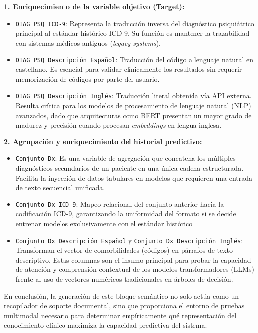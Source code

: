 \documentclass[12pt,a4paper,onecolumn,oneside]{report}
\begin{document}
\textbf{1. Enriquecimiento de la variable objetivo (Target):}
\begin{itemize}
    \item \texttt{DIAG PSQ ICD-9}: Representa la traducción inversa del diagnóstico psiquiátrico principal al estándar histórico ICD-9. Su función es mantener la trazabilidad con sistemas médicos antiguos (\textit{legacy systems}).
    \item \texttt{DIAG PSQ Descripción Español}: Traducción del código a lenguaje natural en castellano. Es esencial para validar clínicamente los resultados sin requerir memorización de códigos por parte del usuario.
    \item \texttt{DIAG PSQ Descripción Inglés}: Traducción literal obtenida vía API externa. Resulta crítica para los modelos de procesamiento de lenguaje natural (NLP) avanzados, dado que arquitecturas como BERT presentan un mayor grado de madurez y precisión cuando procesan \textit{embeddings} en lengua inglesa.
\end{itemize}

\textbf{2. Agrupación y enriquecimiento del historial predictivo:}
\begin{itemize}
    \item \texttt{Conjunto Dx}: Es una variable de agregación que concatena los múltiples diagnósticos secundarios de un paciente en una única cadena estructurada. Facilita la inyección de datos tabulares en modelos que requieren una entrada de texto secuencial unificada.
    \item \texttt{Conjunto Dx ICD-9}: Mapeo relacional del conjunto anterior hacia la codificación ICD-9, garantizando la uniformidad del formato si se decide entrenar modelos exclusivamente con el estándar histórico.
    \item \texttt{Conjunto Dx Descripción Español} y \texttt{Conjunto Dx Descripción Inglés}: Transforman el vector de comorbilidades (códigos) en párrafos de texto descriptivo. Estas columnas son el insumo principal para probar la capacidad de atención y comprensión contextual de los modelos transformadores (LLMs) frente al uso de vectores numéricos tradicionales en árboles de decisión.
\end{itemize}

En conclusión, la generación de este bloque semántico no solo actúa como un recopilador de soporte documental, sino que proporciona el entorno de pruebas multimodal necesario para determinar empíricamente qué representación del conocimiento clínico maximiza la capacidad predictiva del sistema.
\end{document}
